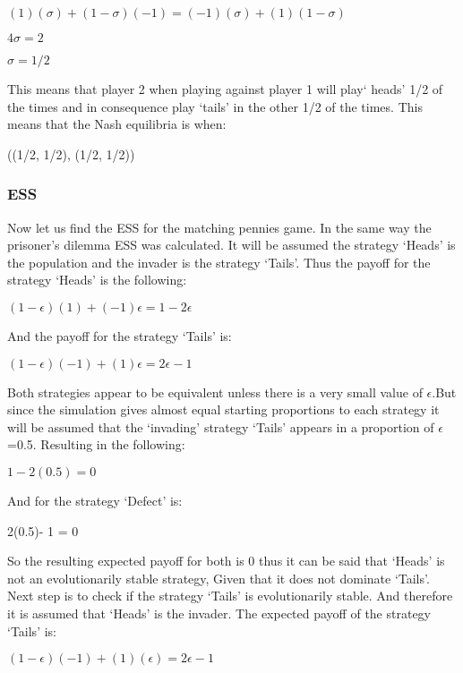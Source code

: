 \begin{center}
$(1)(\sigma) + (1 - \sigma)(-1) = (-1)(\sigma) + (1)(1 - \sigma)$
\end{center}
\begin{center}
$4 \sigma = 2$
\end{center}
\begin{center}
$\sigma = 1/2$
\end{center}

This means that player 2 when playing against player 1 will play` heads'  1/2  of the times and in consequence play `tails' in the other 1/2 of the times. 
This means that the Nash equilibria is when:
\begin{center}
((1/2, 1/2), (1/2, 1/2))
\end{center}

\subsubsection{ESS}
Now let us find the ESS for the matching pennies game. In the same way the prisoner's dilemma ESS was calculated. It will be assumed the strategy  `Heads' is the population and the invader is the strategy `Tails'. Thus the payoff for the strategy `Heads' is the following:
\begin{center}
$(1-{\epsilon})(1) + (-1){\epsilon} = 1 - 2{\epsilon}$
\end{center}
And the payoff for the strategy `Tails' is:
\begin{center}
$(1-{\epsilon})(-1) + (1){\epsilon} = 2{\epsilon} - 1$
\end{center}
Both strategies appear to be equivalent unless there is a very small value of $\epsilon$.But since the simulation gives almost equal starting proportions to each strategy it will be assumed that the `invading' strategy `Tails' appears in a proportion of $\epsilon$=0.5. Resulting in the following:
\begin{center}
$1- 2(0.5) = 0$
\end{center}
And for the strategy `Defect' is:
\begin{center}
 2(0.5)- 1 = 0
\end{center}
So the resulting expected payoff for both is 0 thus it can be said that `Heads' is not an evolutionarily stable strategy, Given that it does not dominate `Tails'.
Next step is to check if the strategy `Tails' is evolutionarily stable. And therefore it is assumed that `Heads' is the invader. The expected payoff of the strategy `Tails' is:
\begin{center}
$(1-{\epsilon})(-1) + (1)({\epsilon}) = 2{\epsilon} -1$
\end{center}
